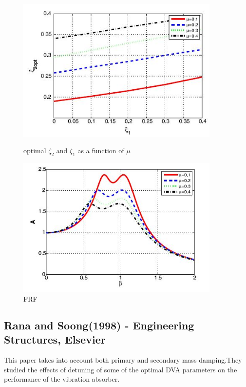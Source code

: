 \begin{figure}[h!]
    \centering
    \begin{minipage}{0.45\textwidth}
        \centering
        \includegraphics[width=0.9\textwidth]{"figures/14"}
        \caption{optimal $\zeta_2$ and $\zeta_1$ as a function of $\mu $}
        
    \end{minipage}\hfill
    \begin{minipage}{0.45\textwidth}
        \centering
        \includegraphics[width=0.9\textwidth]{"figures/13"}
        \caption{FRF}
    \end{minipage}
    
\end{figure}

\subsection{Rana and Soong(1998) - Engineering Structures, Elsevier}
This paper takes into account both primary and secondary mass damping.They studied the effects of detuning of some of the optimal DVA parameters on the performance of the vibration absorber.\\


